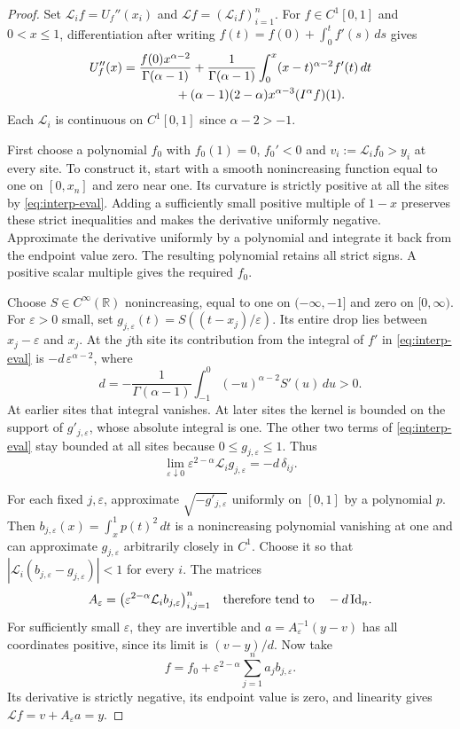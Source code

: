 \documentclass[11pt]{article}
\theoremstyle{remark}\newtheorem{remark}[theorem]{Remark}
\begin{document}
\begin{proof}
Set $\mathcal L_i f=U_f''(x_i)$ and $\mathcal L f=(\mathcal L_i f)_{i=1}^n$.
For $f\in C^1[0,1]$ and $0<x\le1$, differentiation after
writing $f(t)=f(0)+\int_0^t f'(s)\,ds$ gives
\begin{align}
 U_f''(x)
 &=\frac{f(0)x^{\alpha-2}}{\Gamma(\alpha-1)}
 +\frac{1}{\Gamma(\alpha-1)}
       \int_0^x(x-t)^{\alpha-2}f'(t)\,dt \notag\\
 &\hspace{15mm}+(\alpha-1)(2-\alpha)x^{\alpha-3}(I^\alpha f)(1).
 \label{eq:interp-eval}
\end{align}
Each $\mathcal L_i$ is continuous on $C^1[0,1]$ since $\alpha-2>-1$.

First choose a polynomial $f_0$ with $f_0(1)=0$, $f_0'<0$ and
$v_i:=\mathcal L_i f_0> y_i$ at every site. To construct it, start with a
smooth nonincreasing function equal to one on $[0,x_n]$ and zero near
one. Its curvature is strictly positive at all the sites by
\eqref{eq:interp-eval}. Adding a sufficiently small positive multiple
of $1-x$ preserves these strict inequalities and makes the derivative
uniformly negative. Approximate the derivative uniformly by a polynomial
and integrate it back from the endpoint value zero. The resulting
polynomial retains all strict signs. A positive scalar multiple gives
the required $f_0$.

Choose $S\in C^\infty(\mathbb R)$ nonincreasing, equal to one on
$(-\infty,-1]$ and zero on $[0,\infty)$. For $\varepsilon>0$ small, set
$g_{j,\varepsilon}(t)=S((t-x_j)/\varepsilon)$. Its entire drop lies
between $x_j-\varepsilon$ and $x_j$. At the $j$th site its contribution
from the integral of $f'$ in \eqref{eq:interp-eval} is
$-d\,\varepsilon^{\alpha-2}$, where
\[
 d=-\frac{1}{\Gamma(\alpha-1)}
        \int_{-1}^{0}(-u)^{\alpha-2}S'(u)\,du>0.
\]
At earlier sites that integral vanishes. At later sites the kernel is
bounded on the support of $g'_{j,\varepsilon}$, whose absolute integral
is one. The other two terms of \eqref{eq:interp-eval} stay bounded
at all sites because $0\le g_{j,\varepsilon}\le1$. Thus
\[
 \lim_{\varepsilon\downarrow0}
   \varepsilon^{2-\alpha}\mathcal L_i g_{j,\varepsilon}
   =-d\,\delta_{ij}.
\]

For each fixed $j,\varepsilon$, approximate
$\sqrt{-g'_{j,\varepsilon}}$ uniformly on $[0,1]$ by a polynomial $p$.
Then $b_{j,\varepsilon}(x)=\int_x^1 p(t)^2\,dt$ is a nonincreasing
polynomial vanishing at one and can approximate $g_{j,\varepsilon}$
arbitrarily closely in $C^1$. Choose it so that
$|\mathcal L_i(b_{j,\varepsilon}-g_{j,\varepsilon})|<1$ for every $i$.
The matrices
\[
 A_\varepsilon=
  \bigl(\varepsilon^{2-\alpha}\mathcal L_i b_{j,\varepsilon}\bigr)_{i,j=1}^n
 \quad\hbox{therefore tend to}\quad -d\,\mathrm{Id}_n.
\]
For sufficiently small $\varepsilon$, they are invertible and
$a=A_\varepsilon^{-1}(y-v)$ has all coordinates positive, since its
limit is $(v-y)/d$. Now take
\[
 f=f_0+\varepsilon^{2-\alpha}\sum_{j=1}^n a_j b_{j,\varepsilon}.
\]
Its derivative is strictly negative, its endpoint value is zero,
and linearity gives $\mathcal L f=v+A_\varepsilon a=y$.
\end{proof}
\end{document}
